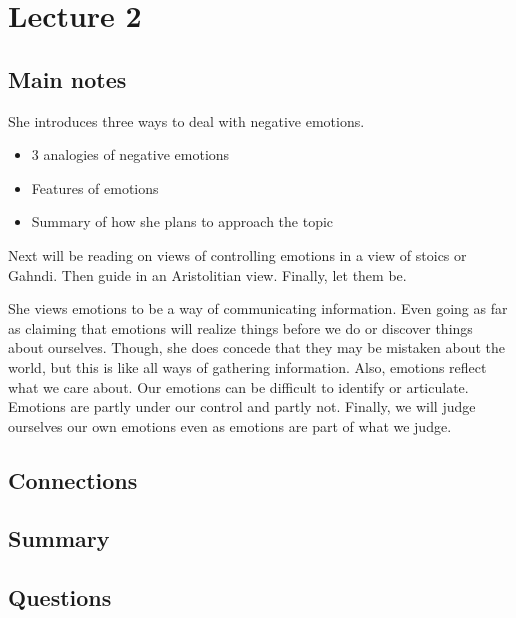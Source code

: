 \section{Lecture 2}

\subsection{Main notes}
She introduces three ways to deal with negative emotions.

\begin{itemize}
	\item 3 analogies of negative emotions
  \item Features of emotions
  \item Summary of how she plans to approach the topic
\end{itemize}

Next will be reading on views of controlling emotions in a view of stoics or Gahndi. Then guide in an Aristolitian view. Finally, let them be.


She views emotions to be a way of communicating information. Even going as far as claiming that emotions will realize things before we do or discover things about ourselves. Though, she does concede that they may be mistaken about the world, but this is like all ways of gathering information. Also, emotions reflect what we care about. Our emotions can be difficult to identify or articulate. Emotions are partly under our control and partly not. Finally, we will judge ourselves our own emotions even as emotions are part of what we judge.
\subsection{Connections}


\subsection{Summary}


\subsection{Questions}
